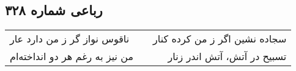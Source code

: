 \begin{center}
\section*{رباعی شماره ۳۲۸}
\label{sec:sh328}
\begin{longtable}{l p{0.5cm} r}
ناقوس نواز گر ز من دارد عار
&&
سجاده نشین اگر ز من کرده کنار
\\
من نیز به رغم هر دو انداخته‌ام
&&
تسبیح در آتش، آتش اندر زنار
\\
\end{longtable}
\end{center}
